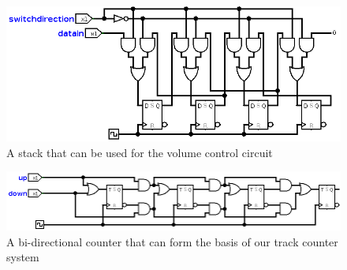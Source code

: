 \documentclass[11pt]{scrartcl}
\begin{document}
\begin{figure}[h]
    \centering
    \includegraphics[scale=0.5]{images/stack.png}
    \caption{A stack that can be used for the volume control circuit}
\end{figure}

\begin{figure}[h]
    \centering
    \includegraphics[scale=0.4]{images/counter.png}
    \caption{A bi-directional counter that can form the basis of our track counter system}
\end{figure}
\end{document}
